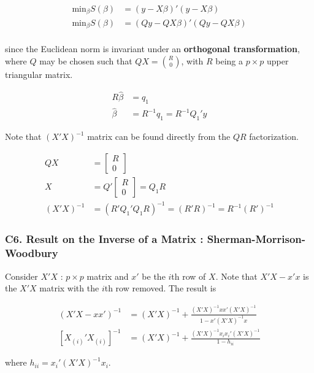 \documentclass[12pt]{article}
\begin{document}
$$
\begin{aligned}
\mathrm{min}_\beta S(\beta) &= (y - X \beta)' (y - X \beta) \\[8pt]
\mathrm{min}_\beta S(\beta) &= (Qy - QX \beta)' (Qy -QX \beta) \\[8pt]
\end{aligned}
$$

since the Euclidean norm is invariant under an \textbf{orthogonal transformation}, where $Q$ may be chosen such that $QX = \binom{R}{0}$, with $R$ being a $p \times p$ upper triangular matrix.


$$
\begin{aligned}
R \hat{\beta} &= q_1 \\[8pt]
\hat{\beta} &= R^{-1} q_1 = R^{-1} Q_1' y
\end{aligned}
$$


Note that $(X'X)^{-1}$ matrix can be found directly from the $QR$ factorization. 


$$
\begin{aligned}
QX &= \begin{bmatrix} R \\ 0 \end{bmatrix} \\[8pt]
X  &= Q' \begin{bmatrix} R \\ 0 \end{bmatrix} = Q_1 R \\[8pt]
(X'X)^{-1} &= (R'Q_1'Q_1R)^{-1} = (R'R)^{-1} = R^{-1}(R')^{-1}
\end{aligned}
$$


\subsubsection*{C6. Result on the Inverse of a Matrix : Sherman-Morrison-Woodbury}

Consider $X'X$ : $p \times p$ matrix and $x'$ be the $i$th row of $X$. Note that $X'X - x'x$ is the $X'X$ matrix with the $i$th row removed. The result is

$$
\begin{aligned}
(X'X - xx')^{-1} &= (X'X)^{-1} + \frac{ (X'X)^{-1} xx' (X'X)^{-1} }{ 1-x'(X'X)^{-1}x } \\[10pt]
[X_{(i)}' X_{(i)}]^{-1} &= (X'X)^{-1} + \frac{ (X'X)^{-1}x_i x_i'(X'X)^{-1} }{ 1-h_{ii} }
\end{aligned}
$$

where $h_{ii} = x_i' (X'X)^{-1} x_i$. 
\end{document}
